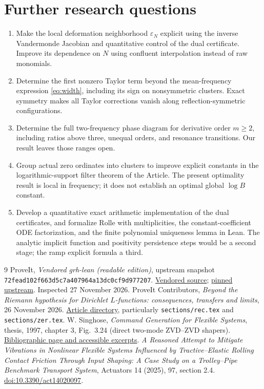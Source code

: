 \documentclass[11pt]{article}
\theoremstyle{remark}\newtheorem{remark}[theorem]{Remark}
\begin{document}
\section{Further research questions}
\begin{enumerate}[leftmargin=*,itemsep=4pt]
\item Make the local deformation neighborhood $\varepsilon_N$ explicit using the inverse Vandermonde Jacobian and quantitative control of the dual certificate. Improve its dependence on $N$ using confluent interpolation instead of raw monomials.
\item Determine the first nonzero Taylor term beyond the mean-frequency expression \eqref{eq:width}, including its sign on nonsymmetric clusters. Exact symmetry makes all Taylor corrections vanish along reflection-symmetric configurations.
\item Determine the full two-frequency phase diagram for derivative order $m\ge2$, including ratios above three, unequal orders, and resonance transitions. Our result leaves those ranges open.
\item Group actual zero ordinates into clusters to improve explicit constants in the logarithmic-support filter theorem of the Article. The present optimality result is local in frequency; it does not establish an optimal global $\log B$ constant.
\item Develop a quantitative exact arithmetic implementation of the dual certificates, and formalize Rolle with multiplicities, the constant-coefficient ODE factorization, and the finite polynomial uniqueness lemma in Lean. The analytic implicit function and positivity persistence steps would be a second stage; the ramp explicit formula a third.
\end{enumerate}

\begin{thebibliography}{9}
 ProveIt, \emph{Vendored grh-lean (readable edition)}, upstream snapshot \texttt{72fead102f663d5c7a407964a13dc0cf9d977207}. \href{https://github.com/VladimirReshetnikov/ProveIt/tree/main/Analysis/GeneralizedRiemannHypothesis/vendor/grh-lean}{Vendored source}; \href{https://github.com/lsernau/grh-lean/tree/72fead102f663d5c7a407964a13dc0cf9d977207/grh}{pinned upstream}. Inspected 27 November 2026.
 ProveIt Contributors, \emph{Beyond the Riemann hypothesis for Dirichlet $L$-functions: consequences, transfers and limits}, 26 November 2026. \href{https://github.com/VladimirReshetnikov/ProveIt/tree/main/Analysis/GeneralizedRiemannHypothesis/Article}{Article directory}, particularly \texttt{sections/rec.tex} and \texttt{sections/zer.tex}.
 W. Singhose, \emph{Command Generation for Flexible Systems}, thesis, 1997, chapter 3, Fig.~3.24 (direct two-mode ZVD--ZVD shapers). \href{https://www.researchgate.net/publication/37605267_Command_generation_for_flexible_systems}{Bibliographic page and accessible excerpts}.
 \emph{A Reasoned Attempt to Mitigate Vibrations in Nonlinear Flexible Systems Influenced by Tractive--Elastic Rolling Contact Friction Through Input Shaping: A Case Study on a Trolley--Pipe Benchmark Transport System}, Actuators 14 (2025), 97, section 2.4. \href{https://doi.org/10.3390/act14020097}{doi:10.3390/act14020097}.
\end{thebibliography}
\end{document}
